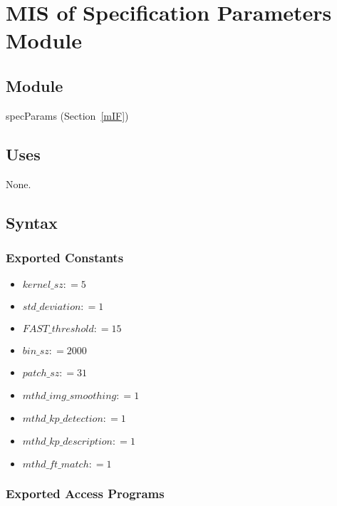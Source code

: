 \documentclass[12pt, titlepage]{article}
\begin{document}
\section{MIS of Specification Parameters Module} \label{mSP}



\subsection{Module}
specParams (Section~\ref{mIF})

\subsection{Uses}
None.

\subsection{Syntax}

\subsubsection{Exported Constants}
\begin{itemize}
  \item $kernel\_sz: = 5$
  \item $std\_deviation: = 1$ 
  \item $FAST\_threshold: = 15$ 
  \item $bin\_sz: = 2000$ 
  \item $patch\_sz: = 31$ 
  \item $mthd\_img\_smoothing: = 1$
  \item $mthd\_kp\_detection: = 1$ 
  \item $mthd\_kp\_description: = 1$
  \item $mthd\_ft\_match: = 1$
\end{itemize}
\subsubsection{Exported Access Programs}
\end{document}

